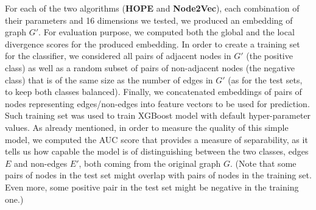 \documentclass[11pt]{article}
\begin{document}
For each of the two algorithms (\textbf{HOPE} and \textbf{Node2Vec}), each combination of their parameters and 16 dimensions we tested, we produced an embedding of graph $G'$. For evaluation purpose, we computed both the global and the local divergence scores for the produced embedding. In order to create a training set for the classifier, we considered all pairs of adjacent nodes in $G'$ (the positive class) as well as a random subset of pairs of non-adjacent nodes (the negative class) that is of the same size as the number of edges in $G'$ (as for the test sets, to keep both classes balanced). Finally, we concatenated embeddings of pairs of nodes representing edges/non-edges into feature vectors to be used for prediction. Such training set was used to train XGBoost model with default hyper-parameter values.  As already mentioned, in order to measure the quality of this simple model, we computed the AUC score that provides a measure of separability, as it tells us how capable the model is of distinguishing between the two classes, edges $E$ and non-edges $E'$, both coming from the original graph $G$. (Note that some pairs of nodes in the test set might overlap with pairs of nodes in the training set. Even more, some positive pair in the test set might be negative in the training one.)
\end{document}
